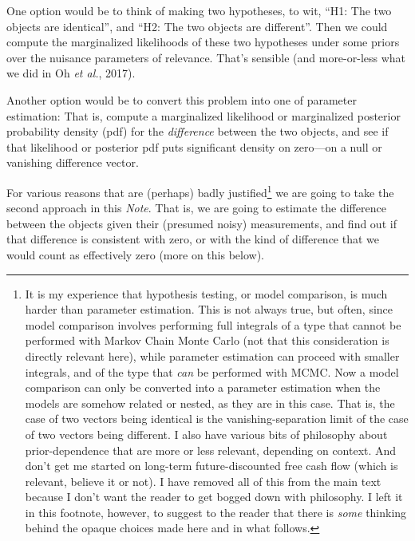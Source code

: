 \documentclass[12pt,letterpaper]{article}
\newcommand{\foreign}[1]{\textsl{#1}}
\newcommand{\acronym}[1]{{\small{#1}}}
\newcommand{\documentname}{\textsl{Note}}
\newcommand{\etal}{\foreign{et al.}}
\begin{document}
One option would be to think of making two hypotheses, to wit, ``H1:
The two objects are identical'', and ``H2: The two objects are
different''. Then we could compute the marginalized likelihoods of
these two hypotheses under some priors over the nuisance parameters of
relevance. That's sensible (and more-or-less what we did in Oh \etal, 2017).

Another option would be to convert this problem into one of parameter
estimation: That is, compute a marginalized likelihood or marginalized
posterior probability density (pdf) for the \emph{difference} between
the two objects, and see if that likelihood or posterior pdf puts
significant density on zero---on a null or vanishing difference
vector.

For various reasons that are (perhaps) badly justified\footnote{%
  It is my experience that hypothesis testing, or model comparison, is
  much harder than parameter estimation. This is not always true, but
  often, since model comparison involves performing full integrals of
  a type that cannot be performed with Markov Chain Monte Carlo (not that
  this consideration is directly relevant here),
  while parameter estimation can proceed with smaller integrals, and of
  the type that \emph{can} be performed with \acronym{MCMC}. Now a model
  comparison can only be converted into a parameter estimation when the
  models are somehow related or nested, as they are in this case. That is,
  the case of two vectors being identical is the vanishing-separation limit
  of the case of two vectors being different. I also have various bits of
  philosophy about prior-dependence that are more or less relevant, depending
  on context. And don't get me started on long-term future-discounted free
  cash flow (which is relevant, believe it or not). I have removed all of this
  from the main text because I don't want the reader to
  get bogged down with philosophy. I left it in this footnote, however, to
  suggest to the reader that there is \emph{some} thinking behind the opaque
  choices made here and in what follows.}
we are going
to take the second approach in this \documentname. That is, we are
going to estimate the difference between the objects given their
(presumed noisy) measurements, and find out if that difference is
consistent with zero, or with the kind of difference that we would count
as effectively zero (more on this below).
\end{document}
